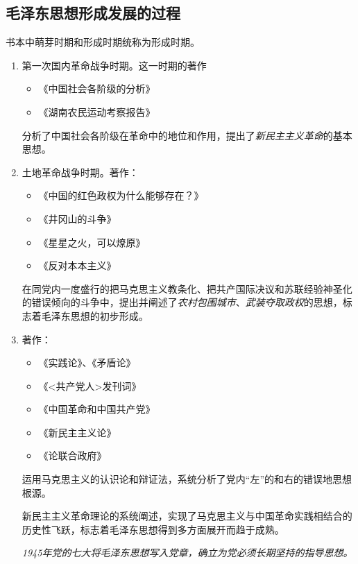     \subsection{毛泽东思想形成发展的过程}
    书本中萌芽时期和形成时期统称为形成时期。
    \begin{enumerate}
        \item {} 第一次国内革命战争时期。这一时期的著作
        \begin{itemize}
            \item 《中国社会各阶级的分析》
            \item 《湖南农民运动考察报告》
        \end{itemize}
        分析了中国社会各阶级在革命中的地位和作用，提出了\emph{新民主主义革命}的基本思想。
        \item {} 土地革命战争时期。著作：
        \begin{itemize}
            \item 《中国的红色政权为什么能够存在？》
            \item 《井冈山的斗争》
            \item 《星星之火，可以燎原》
            \item 《反对本本主义》
        \end{itemize}
        \par 在同党内一度盛行的把马克思主义教条化、把共产国际决议和苏联经验神圣化的错误倾向的斗争中，提出并阐述了\emph{农村包围城市}、\emph{武装夺取政权}的思想，标志着毛泽东思想的初步形成。
        \item {} 著作：
        \begin{itemize}
            \item 《实践论》、《矛盾论》
            \item 《<共产党人>发刊词》
            \item 《中国革命和中国共产党》
            \item 《新民主主义论》
            \item 《论联合政府》
        \end{itemize}
        \par 运用马克思主义的认识论和辩证法，系统分析了党内“左”的和右的错误地思想根源。
        \par 新民主主义革命理论的系统阐述，实现了马克思主义与中国革命实践相结合的历史性飞跃，标志着毛泽东思想得到多方面展开而趋于成熟。
        \par \emph{1945年党的七大将毛泽东思想写入党章，确立为党必须长期坚持的指导思想。}

\end{enumerate}
